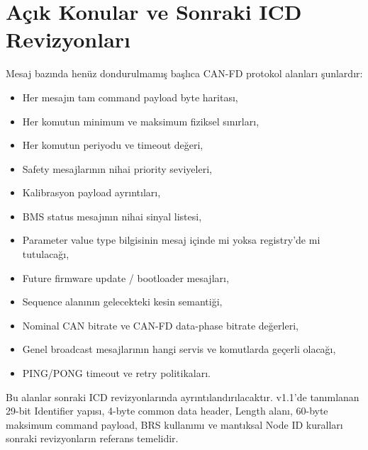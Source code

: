 \documentclass[a4paper,10pt]{article}
\begin{document}
\section{Açık Konular ve Sonraki ICD Revizyonları}

Mesaj bazında henüz dondurulmamış başlıca CAN-FD protokol alanları şunlardır:

\begin{itemize}
    \item Her mesajın tam command payload byte haritası,
    \item Her komutun minimum ve maksimum fiziksel sınırları,
    \item Her komutun periyodu ve timeout değeri,
    \item Safety mesajlarının nihai priority seviyeleri,
    \item Kalibrasyon payload ayrıntıları,
    \item BMS status mesajının nihai sinyal listesi,
    \item Parameter value type bilgisinin mesaj içinde mi yoksa registry'de mi tutulacağı,
    \item Future firmware update / bootloader mesajları,
    \item Sequence alanının gelecekteki kesin semantiği,
    \item Nominal CAN bitrate ve CAN-FD data-phase bitrate değerleri,
    \item Genel broadcast mesajlarının hangi servis ve komutlarda geçerli olacağı,
    \item PING/PONG timeout ve retry politikaları.
\end{itemize}

Bu alanlar sonraki ICD revizyonlarında ayrıntılandırılacaktır. v1.1'de tanımlanan 29-bit
Identifier yapısı, 4-byte common data header, Length alanı, 60-byte maksimum command payload,
BRS kullanımı ve mantıksal Node ID kuralları sonraki revizyonların referans temelidir.
\end{document}
